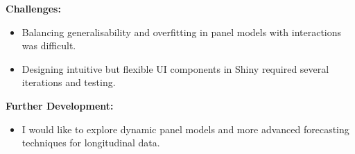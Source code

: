 \documentclass[a4paper, 12pt]{article}
\begin{document}
\textbf{Challenges:}

\begin{itemize}
    \item Balancing generalisability and overfitting in panel models with interactions was difficult.
    \item Designing intuitive but flexible UI components in Shiny required several iterations and testing.
\end{itemize}

\textbf{Further Development:}

\begin{itemize}
    \item I would like to explore dynamic panel models and more advanced forecasting techniques for longitudinal data.
\end{itemize}
\end{document}

